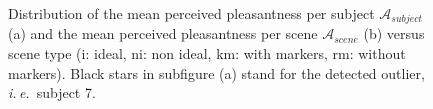 \documentclass[12pt]{elsarticle}
\newcommand{\ie}{\emph{i.\,e.}}
\newcommand{\cf}{cf.}
\newcommand{\myfloatalign}{\centering}
\begin{document}
\begin{figure}[t]
        \myfloatalign
        \caption{Distribution of the mean perceived pleasantness per subject $\mathcal{A}_{subject}$ (a) and the mean perceived pleasantness per scene $\mathcal{A}_{scene}$ (b) versus scene type (i: ideal, ni: non ideal, km: with markers, rm: without markers). Black stars in subfigure (a) stand for the detected outlier, \ie~subject 7.}\label{fig:xp2A}
\end{figure}


\end{document}
